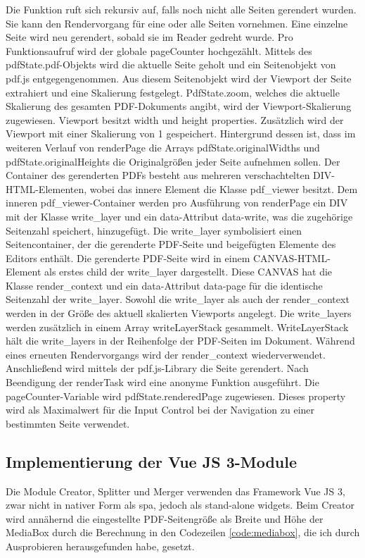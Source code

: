 Die Funktion ruft sich rekursiv auf, falls noch nicht alle Seiten gerendert wurden. Sie kann den Rendervorgang für eine oder alle Seiten vornehmen. Eine einzelne Seite wird neu gerendert, sobald sie im Reader gedreht wurde. Pro Funktionsaufruf wird der globale pageCounter hochgezählt. Mittels des pdfState.pdf-Objekts wird die aktuelle Seite geholt und ein Seitenobjekt von pdf.js entgegengenommen. Aus diesem Seitenobjekt wird der Viewport der Seite extrahiert und eine Skalierung festgelegt. PdfState.zoom, welches die aktuelle Skalierung des gesamten PDF-Dokuments angibt, wird der Viewport-Skalierung zugewiesen. Viewport besitzt width und height properties. Zusätzlich wird der Viewport mit einer Skalierung von 1 gespeichert. Hintergrund dessen ist, dass im weiteren Verlauf von renderPage die Arrays pdfState.originalWidths und pdfState.originalHeights die Originalgrößen jeder Seite aufnehmen sollen. Der Container des gerenderten PDFs besteht aus mehreren verschachtelten DIV-HTML-Elementen, wobei das innere Element die Klasse pdf\_viewer besitzt. Dem inneren pdf\_viewer-Container werden pro Ausführung von renderPage ein DIV mit der Klasse write\_layer und ein data-Attribut data-write, was die zugehörige Seitenzahl speichert, hinzugefügt. Die write\_layer symbolisiert einen Seitencontainer, der die gerenderte PDF-Seite und beigefügten Elemente des Editors enthält. Die gerenderte PDF-Seite wird in einem CANVAS-HTML-Element als erstes child der write\_layer dargestellt. Diese CANVAS hat die Klasse render\_context und ein data-Attribut data-page für die identische Seitenzahl der write\_layer. Sowohl die write\_layer als auch der render\_context werden in der Größe des aktuell skalierten Viewports angelegt. Die write\_layers werden zusätzlich in einem Array writeLayerStack gesammelt. WriteLayerStack hält die write\_layers in der Reihenfolge der PDF-Seiten im Dokument. Während eines erneuten Rendervorgangs wird der render\_context wiederverwendet. Anschließend wird mittels der pdf.js-Library die Seite gerendert. Nach Beendigung der renderTask wird eine anonyme Funktion ausgeführt. Die pageCounter-Variable wird pdfState.renderedPage zugewiesen. Dieses property wird als Maximalwert für die Input Control bei der Navigation zu einer bestimmten Seite verwendet.

\subsection{Implementierung der Vue JS 3-Module}
Die Module Creator, Splitter und Merger verwenden das Framework Vue JS 3, zwar nicht in nativer Form als \gls{spa}, jedoch als stand-alone widgets. Beim Creator wird annähernd die eingestellte PDF-Seitengröße als Breite und Höhe der MediaBox durch die Berechnung in den Codezeilen \ref{code:mediabox}, die ich durch Ausprobieren herausgefunden habe, gesetzt.

